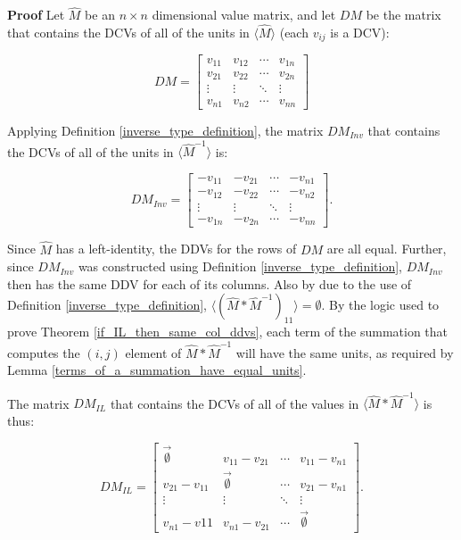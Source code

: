 \documentclass[10pt,letterpaper]{article}
\newenvironment{proof}{\noindent\textbf{Proof} }{\qed \newline}
\newcommand{\qed}{\nobreak \ifvmode \relax \else
      \ifdim\lastskip<1.5em \hskip-\lastskip
      \hskip1.5em plus0em minus0.5em \fi \nobreak
      \vrule height0.75em width0.5em depth0.25em\fi}
\numberwithin{equation}{section}
\begin{document}
\begin{proof} Let $\hat M$ be an $n \times n$ dimensional value
matrix, and let $DM$ be the matrix that contains the DCVs of all
of the units in $\langle \hat M \rangle$ (each $v_{ij}$ is a DCV):

\[ DM = \left[ \begin{matrix} 
  v_{11} & v_{12} & \cdots & v_{1n} \\
  v_{21} & v_{22} & \cdots & v_{2n} \\
  \vdots & \vdots & \ddots & \vdots \\
  v_{n1} & v_{n2} & \cdots & v_{nn}
\end{matrix} \right] \]

Applying Definition \ref{inverse_type_definition}, the matrix $DM_{Inv}$ that
contains the DCVs of all of the units in $\langle \hat M^{-1} \rangle$ is:

\[ DM_{Inv} = \left[ \begin{matrix} 
  -v_{11} & -v_{21} & \cdots & -v_{n1} \\
  -v_{12} & -v_{22} & \cdots & -v_{n2} \\
  \vdots & \vdots & \ddots & \vdots \\
  -v_{1n} & -v_{2n} & \cdots & -v_{nn}
 \end{matrix} \right]. \]

Since $\hat M$ has a left-identity, the DDVs for the rows of $DM$ are
all equal.  Further, since $DM_{Inv}$ was constructed using Definition
\ref{inverse_type_definition}, $DM_{Inv}$ then has the same DDV for
each of its columns.  Also by due to the use of Definition
\ref{inverse_type_definition}, $\langle (\hat M * \hat M^{-1})_{11}
\rangle = \emptyset$.  By the logic used to prove Theorem
\ref{if_IL_then_same_col_ddvs}, each term of the summation that
computes the $(i, j)$ element of $\hat M * \hat M^{-1}$ will have the
same units, as required by Lemma
\ref{terms_of_a_summation_have_equal_units}.

The matrix $DM_{IL}$ that contains the DCVs of all of the values in
$\langle \hat M * \hat M^{-1} \rangle$ is thus:

\[ DM_{IL} = \left[ \begin{matrix} 
  \vec{\emptyset} & v_{11} - v_{21} & \cdots & v_{11} - v_{n1} \\
  v_{21} - v_{11} & \vec{\emptyset} & \cdots & v_{21} - v_{n1} \\
  \vdots & \vdots & \ddots & \vdots \\
  v_{n1} - v{11} & v_{n1} - v_{21} & \cdots & \vec{\emptyset}
 \end{matrix} \right]. \]


\end{proof}
\end{document}
